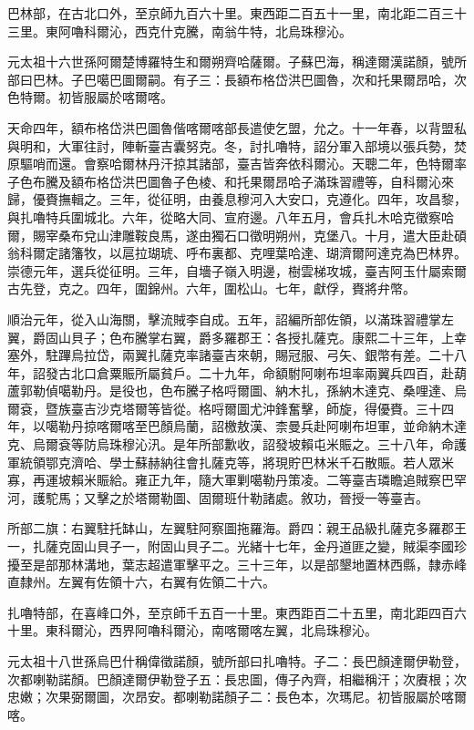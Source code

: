 \begin{pinyinscope}
巴林部，在古北口外，至京師九百六十里。東西距二百五十一里，南北距二百三十三里。東阿嚕科爾沁，西克什克騰，南翁牛特，北烏珠穆沁。

元太祖十六世孫阿爾楚博羅特生和爾朔齊哈薩爾。子蘇巴海，稱達爾漢諾顏，號所部曰巴林。子巴噶巴圖爾嗣。有子三：長額布格岱洪巴圖魯，次和托果爾昂哈，次色特爾。初皆服屬於喀爾喀。

天命四年，額布格岱洪巴圖魯偕喀爾喀部長遣使乞盟，允之。十一年春，以背盟私與明和，大軍往討，陣斬臺吉囊努克。冬，討扎嚕特，詔分軍入部境以張兵勢，焚原驅哨而還。會察哈爾林丹汗掠其諸部，臺吉皆奔依科爾沁。天聰二年，色特爾率子色布騰及額布格岱洪巴圖魯子色棱、和托果爾昂哈子滿珠習禮等，自科爾沁來歸，優賚撫輯之。三年，從征明，由養息穆河入大安口，克遵化。四年，攻昌黎，與扎嚕特兵圍城北。六年，從略大同、宣府邊。八年五月，會兵扎木哈克徵察哈爾，賜宰桑布兌山津雕鞍良馬，遂由獨石口徵明朔州，克堡八。十月，遣大臣赴碩翁科爾定諸籓牧，以扈拉瑚琥、呼布裏都、克哩葉哈達、瑚濟爾阿達克為巴林界。崇德元年，選兵從征明。三年，自墻子嶺入明邊，樹雲梯攻城，臺吉阿玉什屬索爾古先登，克之。四年，圍錦州。六年，圍松山。七年，獻俘，賚將弁幣。

順治元年，從入山海關，擊流賊李自成。五年，詔編所部佐領，以滿珠習禮掌左翼，爵固山貝子；色布騰掌右翼，爵多羅郡王：各授扎薩克。康熙二十三年，上幸塞外，駐蹕烏拉岱，兩翼扎薩克率諸臺吉來朝，賜冠服、弓矢、銀幣有差。二十八年，詔發古北口倉粟賑所屬貧戶。二十九年，命額駙阿喇布坦率兩翼兵四百，赴葫蘆郭勒偵噶勒丹。是役也，色布騰子格哷爾圖、納木扎，孫納木達克、桑哩達、烏爾袞，暨族臺吉沙克塔爾等皆從。格哷爾圖尤沖鋒奮擊，師旋，得優賚。三十四年，以噶勒丹掠喀爾喀至巴顏烏蘭，詔檄敖漢、柰曼兵赴阿喇布坦軍，並命納木達克、烏爾袞等防烏珠穆沁汛。是年所部歉收，詔發坡賴屯米賑之。三十八年，命護軍統領鄂克濟哈、學士蘇赫納往會扎薩克等，將現貯巴林米千石散賑。若人眾米寡，再運坡賴米賑給。雍正九年，隨大軍剿噶勒丹策凌。二等臺吉璘瞻追賊察巴罕河，護駝馬；又擊之於塔爾勒圖、固爾班什勒諸處。敘功，晉授一等臺吉。

所部二旗：右翼駐托缽山，左翼駐阿察圖拖羅海。爵四：親王品級扎薩克多羅郡王一，扎薩克固山貝子一，附固山貝子二。光緒十七年，金丹道匪之變，賊渠李國珍擾至是部那林溝地，葉志超遣軍擊平之。三十三年，以是部墾地置林西縣，隸赤峰直隸州。左翼有佐領十六，右翼有佐領二十六。

扎嚕特部，在喜峰口外，至京師千五百一十里。東西距百二十五里，南北距四百六十里。東科爾沁，西界阿嚕科爾沁，南喀爾喀左翼，北烏珠穆沁。

元太祖十八世孫烏巴什稱偉徵諾顏，號所部曰扎嚕特。子二：長巴顏達爾伊勒登，次都喇勒諾顏。巴顏達爾伊勒登子五：長忠圖，傳子內齊，相繼稱汗；次賡根；次忠嫩；次果弼爾圖，次昂安。都喇勒諾顏子二：長色本，次瑪尼。初皆服屬於喀爾喀。


\end{pinyinscope}

